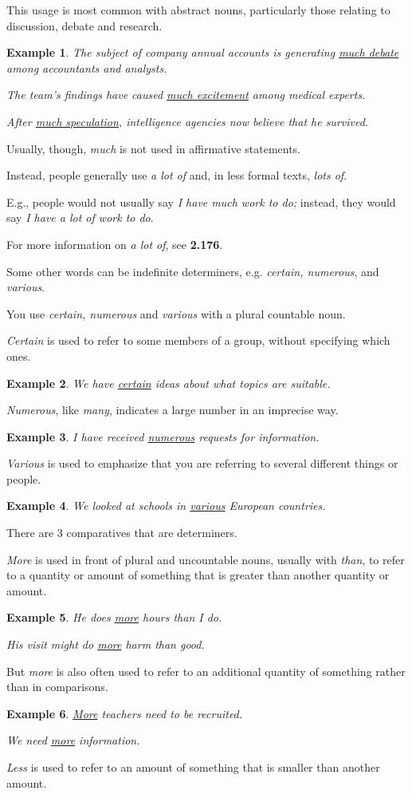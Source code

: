 \documentclass[oneside]{book}
\numberwithin{equation}{section}
\newtheorem{example}{Example}[section]
\begin{document}
This usage is most common with abstract nouns, particularly those relating to discussion, debate and research.
\begin{example}
    The subject of company annual accounts is generating \underline{much debate} among accountants and analysts.
    
    The team's findings have caused \underline{much excitement} among medical experts.
    
    After \underline{much speculation}, intelligence agencies now believe that he survived.
\end{example}
Usually, though, \textit{much} is not used in affirmative statements.

Instead, people generally use \textit{a lot of} and, in less formal texts, \textit{lots of}.

E.g., people would not usually say \textit{I have much work to do;} instead, they would say \textit{I have a lot of work to do}.

For more information on \textit{a lot of}, see \textbf{2.176}.

%
\noindent{} Some other words can be indefinite determiners, e.g. \textit{certain, numerous}, and \textit{various}.

You use \textit{certain, numerous} and \textit{various} with a plural countable noun.

%
\textit{Certain} is used to refer to some members of a group, without specifying which ones.
\begin{example}
    We have \underline{certain} ideas about what topics are suitable.
\end{example}
\textit{Numerous}, like \textit{many}, indicates a large number in an imprecise way.
\begin{example}
    I have received \underline{numerous} requests for information.
\end{example}
\textit{Various} is used to emphasize that you are referring to several different things or people.
\begin{example}
    We looked at schools in \underline{various} European countries.
\end{example}
%
\noindent{} There are 3 comparatives that are determiners.

\textit{More} is used in front of plural and uncountable nouns, usually with \textit{than}, to refer to a quantity or amount of something that is greater than another quantity or amount.
\begin{example}
    He does \underline{more} hours than I do.
    
    His visit might do \underline{more} harm than good.
\end{example}
But \textit{more} is also often used to refer to an additional quantity of something rather than in comparisons.
\begin{example}
    \underline{More} teachers need to be recruited.
    
    We need \underline{more} information.
\end{example}
\textit{Less} is used to refer to an amount of something that is smaller than another amount.
\end{document}
